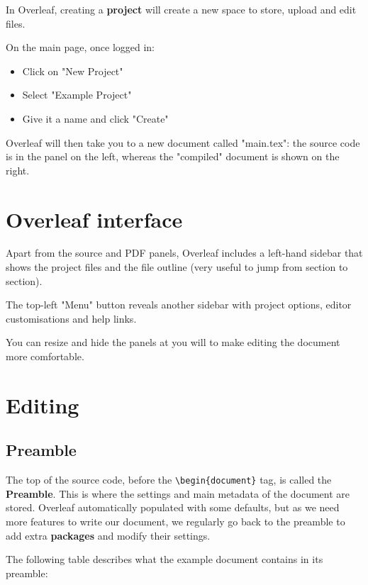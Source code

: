\documentclass[12 pt]{article}
\begin{document}
In Overleaf, creating a \textbf{project} will create a new space to store, upload and edit files.

On the main page, once logged in:
\begin{itemize}
    \item Click on "New Project"
    \item Select "Example Project"
    \item Give it a name and click "Create"
\end{itemize}

Overleaf will then take you to a new document called "main.tex": the source code is in the panel on the left, whereas the "compiled" document is shown on the right.

\section{Overleaf interface}

Apart from the source and PDF panels, Overleaf includes a left-hand sidebar that shows the project files and the file outline (very useful to jump from section to section).

The top-left "Menu" button reveals another sidebar with project options, editor customisations and help links.

You can resize and hide the panels at you will to make editing the document more comfortable.

\section{Editing}

\subsection{Preamble}

The top of the source code, before the \verb+\begin{document}+ tag, is called the \textbf{Preamble}. This is where the settings and main metadata of the document are stored. Overleaf automatically populated with some defaults, but as we need more features to write our document, we regularly go back to the preamble to add extra \textbf{packages} and modify their settings.

The following table describes what the example document contains in its preamble:
\end{document}
